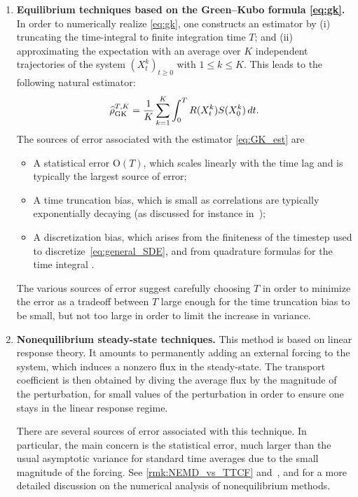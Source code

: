\documentclass[11pt]{article}
\newcommand{\bigO}{\mathrm{O}}
\renewcommand{\geq}{\geqslant}
\renewcommand{\leq}{\leqslant}
\theoremstyle{definition}
\newcommand{\GKest}{\mathcal{\widehat{\rho}}^{T,K}_{\rm GK}}
\begin{document}
\begin{enumerate}
    \item {\bf Equilibrium techniques based on the Green--Kubo formula \eqref{eq:gk}.} In order to numerically realize \eqref{eq:gk}, one constructs an estimator by (i) truncating the time-integral to finite integration time $T$; and (ii) approximating the expectation with an average over $K$ independent trajectories of the system $(X_t^k)_{t\geq 0}$ with $1\leq k\leq K$. This leads to the following natural estimator:
    \begin{equation}
        \GKest = \frac{1}{K}\sum_{k=1}^K \int_0^T R(X_t^k)S(X_0^k) \, dt.
        \label{eq:GK_est}
    \end{equation}
The sources of error associated with the estimator \eqref{eq:GK_est} are

\begin{itemize}
    \item A statistical error $\bigO(T)$, which scales linearly with the time lag \cite{sousaoliveira2017,plechac2022, pavliotis2024,gastaldello2024} and is typically the largest source of error;
    \item A time truncation bias, which is small as correlations are typically exponentially decaying (as discussed for instance in~\cite{plechac2022});
    \item A discretization bias, which arises from the finiteness of the timestep used to discretize~\eqref{eq:general_SDE}, and from quadrature formulas for the time integral \cite{leimkuhler2016,lelievre2016}.
\end{itemize}
The various sources of error suggest carefully choosing $T$ in order to minimize the error as a tradeoff between $T$ large enough for the time truncation bias to be small, but not too large in order to limit the increase in variance.
    
    \item {\bf Nonequilibrium steady-state techniques.} This method is based on linear response theory. It amounts to permanently adding an external forcing to the system, which induces a nonzero flux in the steady-state. The transport coefficient is then obtained by diving the average flux by the magnitude of the perturbation, for small values of the perturbation in order to ensure one stays in the linear response regime.
       
   There are several sources of error associated with this technique. In particular, the main concern is the statistical error, much larger than the usual asymptotic variance for standard time averages due to the small magnitude of the forcing. See \cref{rmk:NEMD_vs_TTCF} and~\cite[Section~5]{lelievre2016}, \cite[Section~2]{spacek2023} and \cite[Section~3]{leimkuhler2016} for a more detailed discussion on the numerical analysis of nonequilibrium methods.
   

\end{enumerate}
\end{document}
